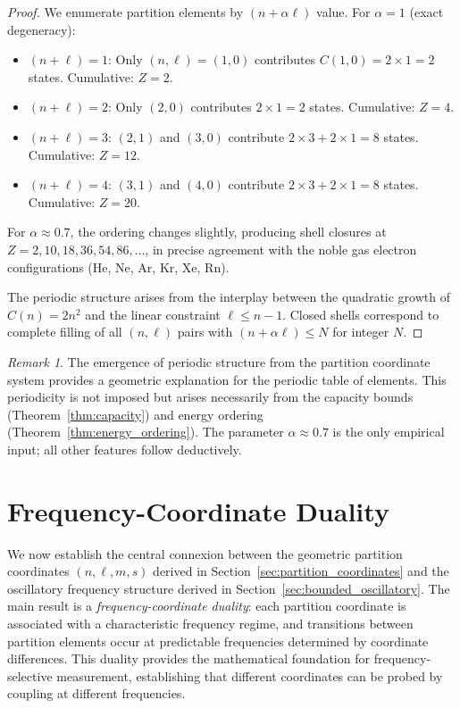 \documentclass[twocolumn,10pt,a4paper]{article}
\theoremstyle{remark}
\newtheorem{remark}[theorem]{Remark}
\begin{document}
\begin{proof}
We enumerate partition elements by $(n + \alpha \ell)$ value. For $\alpha = 1$ (exact degeneracy):
\begin{itemize}[noitemsep]
    \item $(n + \ell) = 1$: Only $(n, \ell) = (1, 0)$ contributes $C(1,0) = 2 \times 1 = 2$ states. Cumulative: $Z = 2$.
    \item $(n + \ell) = 2$: Only $(2, 0)$ contributes $2 \times 1 = 2$ states. Cumulative: $Z = 4$.
    \item $(n + \ell) = 3$: $(2, 1)$ and $(3, 0)$ contribute $2 \times 3 + 2 \times 1 = 8$ states. Cumulative: $Z = 12$.
    \item $(n + \ell) = 4$: $(3, 1)$ and $(4, 0)$ contribute $2 \times 3 + 2 \times 1 = 8$ states. Cumulative: $Z = 20$.
\end{itemize}
For $\alpha \approx 0.7$, the ordering changes slightly, producing shell closures at $Z = 2, 10, 18, 36, 54, 86, \ldots$, in precise agreement with the noble gas electron configurations (He, Ne, Ar, Kr, Xe, Rn).

The periodic structure arises from the interplay between the quadratic growth of $C(n) = 2n^2$ and the linear constraint $\ell \leq n - 1$. Closed shells correspond to complete filling of all $(n, \ell)$ pairs with $(n + \alpha \ell) \leq N$ for integer $N$.
\end{proof}

\begin{remark}
The emergence of periodic structure from the partition coordinate system provides a geometric explanation for the periodic table of elements. This periodicity is not imposed but arises necessarily from the capacity bounds (Theorem~\ref{thm:capacity}) and energy ordering (Theorem~\ref{thm:energy_ordering}). The parameter $\alpha \approx 0.7$ is the only empirical input; all other features follow deductively.
\end{remark}


\section{Frequency-Coordinate Duality}
\label{sec:frequency_duality}

We now establish the central connexion between the geometric partition coordinates $(n, \ell, m, s)$ derived in Section~\ref{sec:partition_coordinates} and the oscillatory frequency structure derived in Section~\ref{sec:bounded_oscillatory}. The main result is a \emph{frequency-coordinate duality}: each partition coordinate is associated with a characteristic frequency regime, and transitions between partition elements occur at predictable frequencies determined by coordinate differences. This duality provides the mathematical foundation for frequency-selective measurement, establishing that different coordinates can be probed by coupling at different frequencies.
\end{document}
